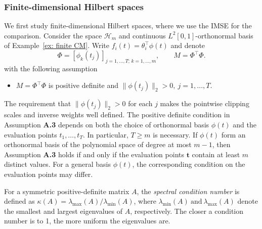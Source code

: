 \documentclass[twoside,11pt]{article}
\begin{document}
\subsubsection{Finite-dimensional Hilbert spaces}
We first study finite-dimensional Hilbert spaces, where we use the IMSE for the comparison. Consider the space $\mathcal H_m$ and continuous $L^2[0,1]$-orthonormal basis of Example~\ref{ex: finite CM}. Write $f_i(t)=\theta_i^\top\phi(t)$ and denote
\[
\Phi=[\phi_k(t_j)]_{j=1,\ldots,T;\,k=1,\ldots,m},\qquad M=\Phi^\top\Phi.
\]
with the following assumption
\begin{itemize}
    \item [\textbf{A.3}] $M = \Phi^\top\Phi$ is positive definite and $\|\phi(t_j)\|_2>0,\ j=1,\ldots,T$.
\end{itemize}
The requirement that $\|\phi(t_j)\|_2>0$ for each $j$ makes the pointwise clipping scales and inverse weights well defined. The positive definite condition in Assumption \textbf{A.3} depends on both the choice of orthonormal basis $\phi(t)$ and the evaluation points $t_1,\ldots,t_T$. In particular, $T\geq m$ is necessary. If $\phi(t)$ form an orthonormal basis of the polynomial space of degree at most $m-1$, then Assumption \textbf{A.3} holds if and only if the evaluation points $\mathbf{t}$ contain at least $m$ distinct values. For a general basis $\phi(t)$, the corresponding condition on the evaluation points may differ.

For a symmetric positive-definite matrix $A$, the \emph{spectral condition number} is defined as 
$\kappa(A)=\lambda_{\max}(A)/\lambda_{\min}(A)$, 
where $\lambda_{\min}(A)\ \text{and}\ \lambda_{\max}(A)$ denote the smallest and largest eigenvalues of $A$, respectively. The closer a condition number is to 1, the more uniform the eigenvalues are.
\end{document}

